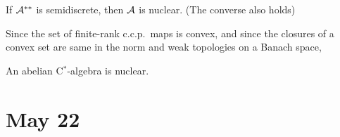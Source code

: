 \documentclass{../../small}
\begin{document}
\begin{thm}
If $\mathcal{A}^{**}$ is semidiscrete, then $\mathcal{A}$ is nuclear.
(The converse also holds)
\end{thm}
\begin{pf}
Since the set of finite-rank c.c.p.~maps is convex, and since the closures of a convex set are same in the norm and weak topologies on a Banach space, 
\end{pf}

\begin{thm}
An abelian C$^*$-algebra is nuclear.
\end{thm}



\newpage
\section{May 22}
\end{document}
